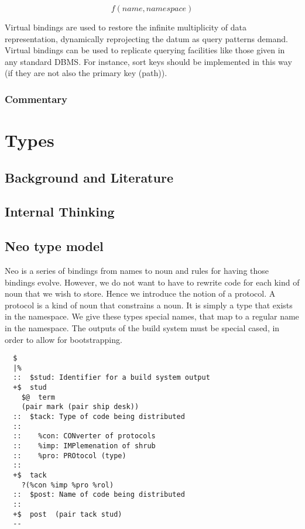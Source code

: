 \documentclass[twoside]{report}
\begin{document}
$$ f(\mathit{name}, \mathit{namespace}) $$

Virtual bindings are used to restore the infinite multiplicity of data representation, dynamically reprojecting the datum as query patterns demand. Virtual bindings can be used to replicate querying facilities like those given in any standard DBMS. For instance, sort keys should be implemented in this way (if they are not also the primary key (path)).

\subsection{Commentary}


\chapter{Types}

\section{Background and Literature}
\section{Internal Thinking}
\section{Neo type model}

Neo is a series of bindings from names to noun and rules for having those bindings evolve. However, we do not want to have to rewrite code for each kind of noun that we wish to store. Hence we introduce the notion of a protocol. A protocol is a kind of noun that constrains a noun. It is simply a type that exists in the namespace. We give these types special names, that map to a regular name in the namespace. The outputs of the build system must be special cased, in order to allow for bootstrapping.

\lstset{language=Hoon}
\begin{lstlisting}
  $
  |%
  ::  $stud: Identifier for a build system output
  +$  stud
    $@  term
    (pair mark (pair ship desk))
  ::  $tack: Type of code being distributed
  ::
  ::    %con: CONverter of protocols
  ::    %imp: IMPlemenation of shrub
  ::    %pro: PROtocol (type)
  ::
  +$  tack
    ?(%con %imp %pro %rol)
  ::  $post: Name of code being distributed
  ::
  +$  post  (pair tack stud)
  --

\end{lstlisting}
\end{document}
